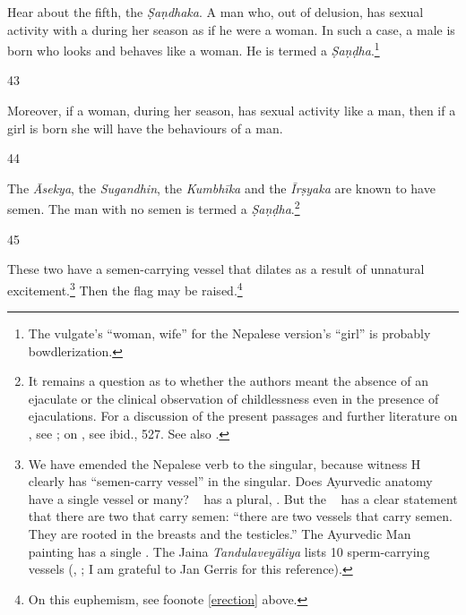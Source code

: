 \begin{translation}
Hear about the fifth, the \emph{Ṣaṇdhaka}.  A man who, out of
delusion, has sexual activity with a  during
her season as if he were a woman.  In such a case, a male is born who
looks and behaves like a woman.  He is termed a
\emph{Ṣaṇḍha}.\footnote{The vulgate's  “woman, wife” for
the Nepalese version's    “girl” is probably bowdlerization.}
    
\item[43]
    
Moreover, if a woman, during her season, has sexual activity like a man, then 
if a girl is born she will have the behaviours of a man.

\item[44]

The \emph{Āsekya}, the \emph{Sugandhin}, the \emph{Kumbhīka} and the
\emph{Īrṣyaka} are known to have semen.  The man with no semen is
termed a \emph{Ṣaṇḍha}.\footnote{It remains a question as to whether
    the authors meant the absence of an ejaculate or the clinical
    observation of childlessness even in the presence of ejaculations.
    For a discussion of the present passages and further literature on
    , see \cites[581--584]{das-2003}; on , see ibid., 
    527.  See also \cite[593--597, et passim]{swee-1993}.}
    
\item [45]

These two have a semen-carrying vessel that dilates as a result of
unnatural excitement.\footnote{We have emended the Nepalese verb to
    the singular, because witness H clearly has 
    “semen-carry vessel” in the singular. Does Ayurvedic anatomy have a
    single vessel or many? \CS\  has a plural,
    .  But the \SS\  has a
    clear statement that there are two  that carry semen: 
     “there are two vessels that carry semen.  They are
    rooted in the breasts and the testicles.”  The Ayurvedic Man painting
    has a single  \citep[233, 243]{wuja-2008a}.  The Jaina
    \emph{Tandulaveyāliya} lists 10 sperm-carrying vessels (, \cites[145\,ff.]{schu-1969}[5]{cail-2019}; I am 
    grateful to Jan 
    Gerris for this reference).}  Then
    the flag may be raised.\footnote{On this euphemism, see foonote
        \ref{erection} above.}



\end{translation}

